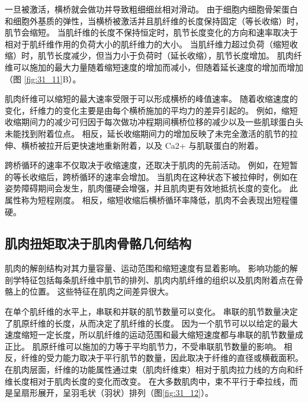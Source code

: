 一旦被激活，横桥就会做功并导致粗细细丝相对滑动。 由于细胞内细胞骨架蛋白和细胞外基质的弹性，当横桥被激活并且肌纤维的长度保持固定（等长收缩）时，肌节会缩短。 当肌纤维的长度不保持恒定时，肌节长度变化的方向和速率取决于相对于肌纤维作用的负荷大小的肌纤维力的大小。 当肌纤维力超过负荷（缩短收缩）时，肌节长度减少，但当力小于负荷时（延长收缩），肌节长度增加。 肌肉纤维可以施加的最大力量随着缩短速度的增加而减小，但随着延长速度的增加而增加（图 \ref{fig:31_11}B）。

肌肉纤维可以缩短的最大速率受限于可以形成横桥的峰值速率。 随着收缩速度的变化，纤维力的变化主要是由每个横桥施加的平均力的差异引起的。 例如，缩短收缩期间力的减少可归因于每次做功冲程期间横桥位移的减少以及一些肌球蛋白头未能找到附着位点。 相反，延长收缩期间力的增加反映了未完全激活的肌节的拉伸、横桥被拉开后更快速地重新附着，以及 Ca2+ 与肌联蛋白的附着。

跨桥循环的速率不仅取决于收缩速度，还取决于肌肉的先前活动。 例如，在短暂的等长收缩后，跨桥循环的速率会增加。 当肌肉在这种状态下被拉伸时，例如在姿势障碍期间会发生，肌肉僵硬会增强，并且肌肉更有效地抵抗长度的变化。 此属性称为短程刚度。 相反，缩短收缩后横桥循环率降低，肌肉不会表现出短程僵硬。

\subsection{肌肉扭矩取决于肌肉骨骼几何结构}
肌肉的解剖结构对其力量容量、运动范围和缩短速度有显着影响。 影响功能的解剖学特征包括每条肌纤维中肌节的排列、肌肉内肌纤维的组织以及肌肉附着点在骨骼上的位置。 这些特征在肌肉之间差异很大。

在单个肌纤维的水平上，串联和并联的肌节数量可以变化。 串联的肌节数量决定了肌原纤维的长度，从而决定了肌纤维的长度。 因为一个肌节可以以给定的最大速度缩短一定长度，所以肌纤维的运动范围和最大缩短速度都与串联的肌节数量成正比。 肌原纤维可以施加的力等于平均肌节力，不受串联肌节数量的影响。 相反，纤维的受力能力取决于平行肌节的数量，因此取决于纤维的直径或横截面积。 在肌肉层面，纤维的功能属性通过束（肌肉纤维束）相对于肌肉拉力线的方向和纤维长度相对于肌肉长度的变化而改变。 
在大多数肌肉中，束不平行于牵拉线，而是呈扇形展开，呈羽毛状（羽状）排列（图\ref{fig:31_12}）。

